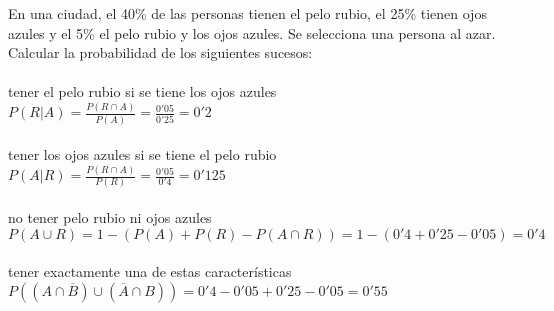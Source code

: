
\problem
En una ciudad, el 40\% de las personas tienen el pelo rubio, el 25\% tienen ojos azules y el 5\% el pelo rubio y los ojos azules. Se selecciona una persona al azar. Calcular la probabilidad de los siguientes sucesos: \\ \\
\subproblem
tener el pelo rubio si se tiene los ojos azules \\
$P(R|A) = \frac{P(R \cap A)}{P(A)} = \frac{0'05}{0'25} = 0'2$ \\ \\
\subproblem
tener los ojos azules si se tiene el pelo rubio \\
$P(A|R) = \frac{P(R \cap A)}{P(R)} = \frac{0'05}{0'4} = 0'125$ \\ \\
\subproblem
no tener pelo rubio ni ojos azules \\ 
$P(A \cup R) = 1 - (P(A)+P(R)-P(A\cap R)) = 1 - (0'4+0'25-0'05) = 0'4 $ \\ \\
\subproblem
tener exactamente una de estas características \\
$P((A\cap \overline{B}) \cup (\overline{A} \cap B)) = 0'4 - 0'05 + 0'25 - 0'05 = 0'55 $ \\ 